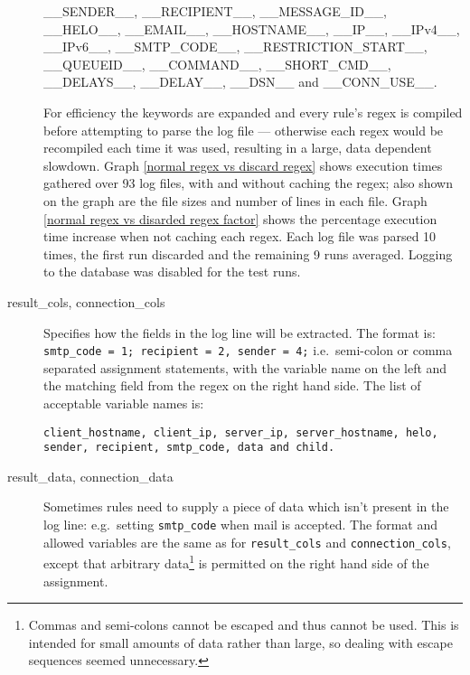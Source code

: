\documentclass[a4paper,12pt,draft]{article}
\begin{document}
\begin{description}
        \_\_SENDER\_\_, \_\_RECIPIENT\_\_, \_\_MESSAGE\_ID\_\_,
        \_\_HELO\_\_, \newline \_\_EMAIL\_\_, \_\_HOSTNAME\_\_, \_\_IP\_\_,
        \_\_IPv4\_\_, \_\_IPv6\_\_, \newline \_\_SMTP\_CODE\_\_,
        \_\_RESTRICTION\_START\_\_, \_\_QUEUEID\_\_, \newline
        \_\_COMMAND\_\_, \_\_SHORT\_CMD\_\_, \_\_DELAYS\_\_, \_\_DELAY\_\_,
        \_\_DSN\_\_ and \_\_CONN\_USE\_\_.


        For efficiency the keywords are expanded and every rule's regex is
        compiled before attempting to parse the log file --- otherwise each
        regex would be recompiled each time it was used, resulting in a
        large, data dependent slowdown.  Graph \ref{normal regex vs discard
        regex} shows execution times gathered over 93 log files, with and
        without caching the regex; also shown on the graph are the file
        sizes and number of lines in each file.  Graph \ref{normal regex vs
        disarded regex factor} shows the percentage execution time increase
        when not caching each regex.  Each log file was parsed 10 times,
        the first run discarded and the remaining 9 runs averaged.  Logging
        to the database was disabled for the test runs.
        

    \item [result\_cols, connection\_cols] Specifies how the fields in the
        log line will be extracted.  The format is: \newline
        \texttt{smtp\_code = 1; recipient = 2, sender = 4;} \newline
        i.e.\ semi-colon or comma separated assignment statements, with the
        variable name on the left and the matching field from the regex on
        the right hand side.  The list of acceptable variable names is:

        \texttt{client\_hostname, client\_ip, server\_ip, server\_hostname,
        \newline helo, sender, recipient, smtp\_code, data and child.}

    \item [result\_data, connection\_data] Sometimes rules need to supply a
        piece of data which isn't present in the log line: e.g.\ setting
        \texttt{smtp\_code} when mail is accepted.  The format and allowed
        variables are the same as for \texttt{result\_cols} and
        \texttt{connection\_cols}, except that arbitrary
        data\footnote{Commas and semi-colons cannot be escaped and thus
        cannot be used.  This is intended for small amounts of data rather
        than large, so dealing with escape sequences seemed unnecessary.}
        is permitted on the right hand side of the assignment.


\end{description}
\end{document}
